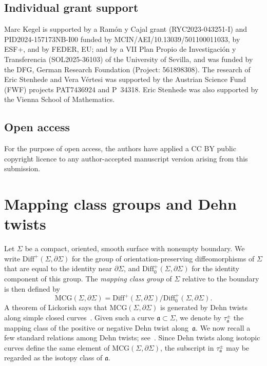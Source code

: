 \documentclass{amsart}
\numberwithin{equation}{section}
\numberwithin{figure}{section}
\theoremstyle{definition}
\theoremstyle{remark}
\let\oldSigma\Sigma
\renewcommand{\Sigma}{\oldSigma}
\let\oldtau\tau
\renewcommand{\tau}{\oldtau}
\newcommand{\MCG}{\mathrm{MCG}}
\renewcommand{\aa}{\mathfrak{a}}
\begin{document}
\subsection*{Individual grant support}
Marc Kegel is supported by a Ram\'on y Cajal grant \mbox{(RYC2023-043251-I)} and PID2024-157173NB-I00 funded by MCIN/AEI/10.13039/501100011033, by ESF+, and by FEDER, EU; and by a VII Plan Propio de Investigación y Transferencia (SOL2025-36103) of the University of Sevilla, and was funded by the DFG, German Research Foundation (Project: 561898308). 
The research of Eric Stenhede and Vera Vértesi was supported by the Austrian Science Fund (FWF) projects PAT7436924 and P~34318. Eric Stenhede was also supported by the Vienna School of Mathematics.

\subsection*{Open access}
For the purpose of open access, the authors have applied a CC BY public copyright licence to any author-accepted manuscript version arising from this submission.


\section{Mapping class groups and Dehn twists}\label{sec:MCG}

Let $\Sigma$ be a compact, oriented, smooth surface with nonempty boundary. We write $\mathrm{Diff}^+(\Sigma,\partial\Sigma)$ for the group of orientation-preserving diffeomorphisms of $\Sigma$ that are equal to the identity near $\partial\Sigma$, and $\mathrm{Diff}^+_0(\Sigma,\partial\Sigma)$ for the identity component of this group. The \emph{mapping class group} of $\Sigma$ relative to the boundary is then defined by
\[
\MCG(\Sigma,\partial\Sigma)
=
\mathrm{Diff}^+(\Sigma,\partial\Sigma)/\mathrm{Diff}^+_0(\Sigma,\partial\Sigma).
\]
A theorem of Lickorish says that $\MCG(\Sigma,\partial\Sigma)$ is generated by Dehn twists along simple closed curves~\cite{Lickorish_MCG}. Given such a curve $\aa\subset\Sigma$, we denote by $\tau_\aa^\pm$ the mapping class of the positive or negative Dehn twist along~$\aa$.
We now recall a few standard relations among Dehn twists; see~\cite{FM12}. Since Dehn twists along isotopic curves define the same element of $\MCG(\Sigma,\partial\Sigma)$, the subscript in $\tau_\aa^\pm$ may be regarded as the isotopy class of $\aa$.
\end{document}
